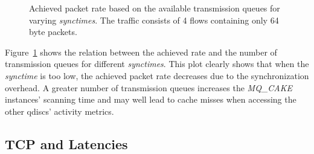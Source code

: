 %
\begin{figure}[H]
    \centering
    
    \caption{Achieved packet rate based on the available transmission queues for varying \textit{synctimes}. The traffic consists of 4 flows containing only 64 byte packets.}\label{fig:sync_txq_64}
\end{figure}
Figure~\ref{fig:sync_txq_64} shows the relation between the achieved rate and the number of transmission queues for different \textit{synctimes}.
%
This plot clearly shows that when the \textit{synctime} is too low, the achieved packet rate decreases due to the synchronization overhead.
%
A greater number of transmission queues increases the \textit{MQ\_CAKE} instances' scanning time and may well lead to cache misses when accessing the other qdiscs' activity metrics.
%

\subsection{TCP and Latencies}
\begin{figure}
    \centering
    
    \caption{}\label{fig:flent_tp}
\end{figure}

\begin{figure}
    \centering
    
    \caption{}\label{fig:flent_ping}
\end{figure}